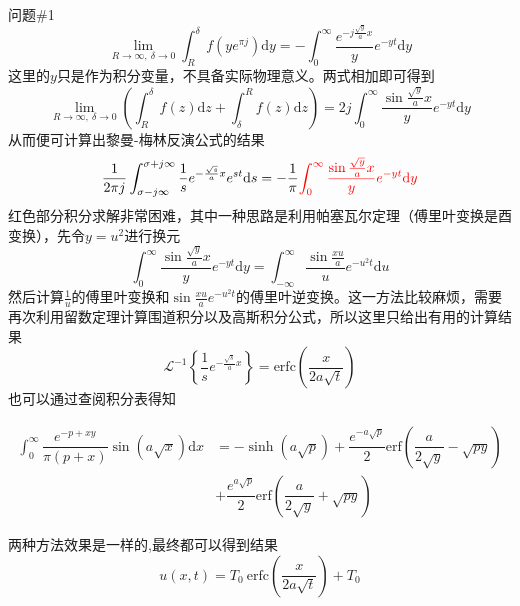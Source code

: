 \documentclass[12pt]{ctexart}
\begin{document}
    \begin{problem}{问题\#1}
        $$
        \lim_{R\to\infty,\ \delta\to0
        }
            \int^{\delta}_{R}f(ye^{\pi j})\mathrm{d}y=
            -\int^{\infty}_{0}\dfrac{e^{-j\frac{\sqrt{y}}{a}x}}{y}e^{-yt}\mathrm{d}y
        $$
        这里的$y$只是作为积分变量，不具备实际物理意义。两式相加即可得到
        $$
        \lim_{R\to\infty,\ \delta\to0
        }
        \left(
            \int^{\delta}_{R}f(z)\mathrm{d}z+\int^{R}_{\delta}f(z)\mathrm{d}z
        \right)=2j\int^{\infty}_{0}\dfrac{\sin\frac{\sqrt{y}}{a}x}{y}e^{-yt}\mathrm{d}y
        $$
        从而便可计算出黎曼-梅林反演公式的结果
        $$
        \dfrac{1}{2\pi j}\int^{\sigma+j\infty}_{\sigma-j\infty}\dfrac{1}{s}e^{-\frac{\sqrt{s}}{a}x}e^{st}\mathrm{d}s=-\dfrac{1}{\pi}
        {\color{red}
        \int^{\infty}_{0}\dfrac{\sin\frac{\sqrt{y}}{a}x}{y}e^{-yt}\mathrm{d}y
        }
        $$
        红色部分积分求解非常困难，其中一种思路是利用帕塞瓦尔定理（傅里叶变换是酉变换），先令$y=u^2$进行换元
        $$
        \int^{\infty}_{0}\dfrac{\sin\frac{\sqrt{y}}{a}x}{y}e^{-yt}\mathrm{d}y=
        \int^{\infty}_{-\infty}\dfrac{\sin\frac{xu}{a}}{u}e^{-u^2t}\mathrm{d}u
        $$
        然后计算$\frac{1}{u}$的傅里叶变换和$\sin\frac{xu}{a}e^{-u^2t}$的傅里叶逆变换。这一方法比较麻烦，需要再次利用留数定理计算围道积分以及高斯积分公式，所以这里只给出有用的计算结果
        $$
        \mathscr{L}^{-1}\left\{\dfrac{1}{s}e^{-\frac{\sqrt{s}}{a}x}\right\}=\text{erfc}\left(\dfrac{x}{2a\sqrt{t}}\right)
        $$
        也可以通过查阅积分表得知
        \begin{formal}
            $$
            \begin{aligned}
                \int^{\infty}_{0}\dfrac{e^{-{p+x}y}}{\pi(p+x)}\sin(a\sqrt{x})\mathrm{d}x&=
                -\sinh(a\sqrt{p})+\dfrac{e^{-a\sqrt{p}}}{2}\text{erf}\left(\dfrac{a}{2\sqrt{y}}-\sqrt{py}\right)\\
                &+\dfrac{e^{a\sqrt{p}}}{2}\text{erf}\left(\dfrac{a}{2\sqrt{y}}+\sqrt{py}\right)
            \end{aligned}
            $$
        \end{formal}
        两种方法效果是一样的,最终都可以得到结果
        $$
        u(x,t)=T_0\ \text{erfc}\left(\dfrac{x}{2a\sqrt{t}}\right)+T_0
        $$

    \end{problem}
\end{document}
